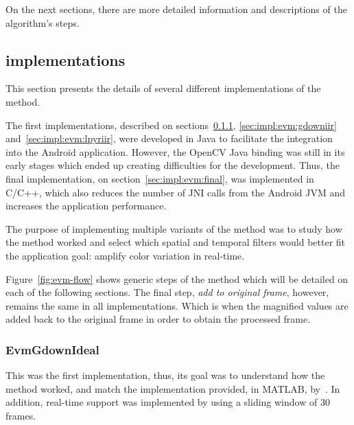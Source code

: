 On the next sections, there are more detailed information and descriptions
of the algorithm's steps.

\subsection{\evm{} implementations} \label{sec:impl:evm}


This section presents the details of several different implementations of the
\evm{} method.

The first implementations, described on sections~\ref{sec:impl:evm:gdownideal},
\ref{sec:impl:evm:gdowniir} and~\ref{sec:impl:evm:lpyriir},
were developed in Java to facilitate the integration into the Android
application. However, the OpenCV Java binding was still in its early stages
which ended up creating difficulties for the development. Thus, the final
implementation, on section~\ref{sec:impl:evm:final}, was implemented in C/C++,
which also reduces the number of JNI calls from the Android JVM and
increases the application performance.

The purpose of implementing multiple variants of the method was to study
how the method worked and select which spatial and temporal filters would
better fit the application goal: amplify color variation in real-time.

Figure~\ref{fig:evm-flow} shows generic steps of the method which will be
detailed on each of the following sections. The final step,
\emph{add to original frame}, however, remains the same in all
implementations. Which is when the magnified values are added back to the
original frame in order to obtain the processed frame.

\subsubsection{EvmGdownIdeal} \label{sec:impl:evm:gdownideal}

This was the first implementation, thus, its goal was to understand how the
method worked, and match the implementation provided, in MATLAB,
by~\cite{Wu2012Eulerian}. In addition, real-time support was implemented
by using a sliding window of $30$ frames.

